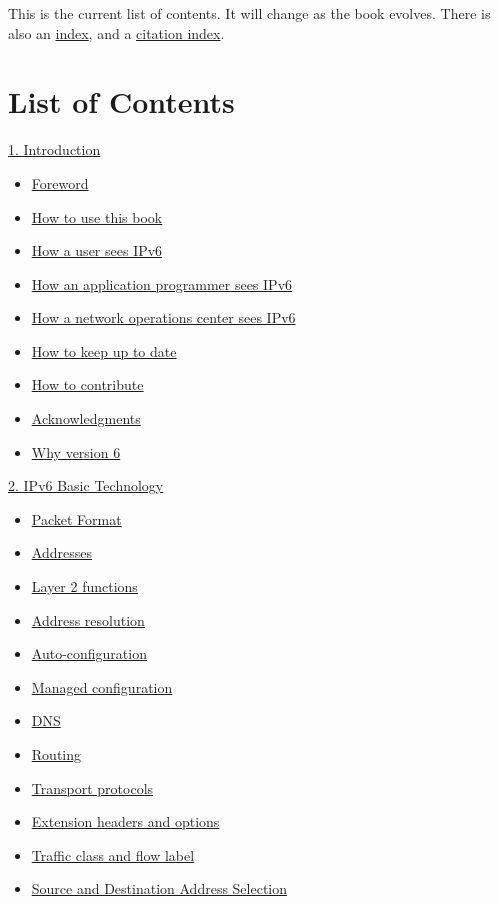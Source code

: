 \documentclass[
]{article}
\providecommand{\tightlist}{%
  \setlength{\itemsep}{0pt}\setlength{\parskip}{0pt}}
\begin{document}
This is the current list of contents. It will change as the book
evolves. There is also an \hyperref[book6-main-index]{index}, and a
\hyperref[book6-citation-index]{citation index}.

\section{List of Contents}\label{list-of-contents}

\hyperref[introduction-and-foreword]{1. Introduction}

\begin{itemize}
\tightlist
\item
  \hyperref[foreword]{Foreword}
\item
  \hyperref[how-to-use-this-book]{How to use this book}
\item
  \hyperref[how-a-user-sees-ipv6]{How a user sees IPv6}
\item
  \hyperref[how-an-application-programmer-sees-ipv6]{How an application
  programmer sees IPv6}
\item
  \hyperref[how-a-network-operations-center-sees-ipv6]{How a network
  operations center sees IPv6}
\item
  \hyperref[how-to-keep-up-to-date]{How to keep up to date}
\item
  \hyperref[how-to-contribute]{How to contribute}
\item
  \hyperref[acknowledgments]{Acknowledgments}
\item
  \hyperref[why-version-6]{Why version 6}
\end{itemize}

\hyperref[ipv6-basic-technology]{2. IPv6 Basic Technology}

\begin{itemize}
\tightlist
\item
  \hyperref[packet-format]{Packet Format}
\item
  \hyperref[addresses]{Addresses}
\item
  \hyperref[layer-2-functions]{Layer 2 functions}
\item
  \hyperref[address-resolution]{Address resolution}
\item
  \hyperref[auto-configuration]{Auto-configuration}
\item
  \hyperref[managed-configuration]{Managed configuration}
\item
  \hyperref[dns]{DNS}
\item
  \hyperref[routing]{Routing}
\item
  \hyperref[transport-protocols]{Transport protocols}
\item
  \hyperref[extension-headers-and-options]{Extension headers and
  options}
\item
  \hyperref[traffic-class-and-flow-label]{Traffic class and flow label}
\item
  \hyperref[source-and-destination-address-selection]{Source and
  Destination Address Selection}
\end{itemize}
\end{document}
